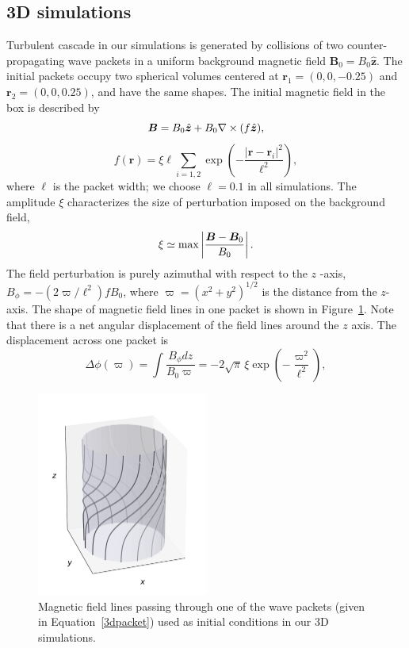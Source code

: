\subsection{3D simulations}\label{sec:3d}
%
Turbulent cascade in our simulations is generated by collisions of two counter-propagating \alfven wave packets in a uniform background magnetic field $\boldsymbol{B}_0=B_0\hat{\boldsymbol{z}}$. 
The initial packets occupy two spherical volumes centered at $\boldsymbol{r}_1 = (0,0,-0.25)$ and $\boldsymbol{r}_2 = (0,0,0.25)$, and have the same shapes. The initial magnetic field in the box is described by
%
\begin{equation}
  \boldsymbol{B} = B_0\hat{\boldsymbol{z}}+ B_0\nabla \times(f\hat{\boldsymbol{z}}),
\end{equation}
\begin{equation}\label{3dpacket}
	f(\boldsymbol{r}) = \xi\ell\sum\limits_{i=1,2} \exp\left(- \frac{|\boldsymbol{r}-\boldsymbol{r}_i|^2}{\ell^2} \right),  
\end{equation}
%
where  $\ell$ is the packet width; we choose $\ell=0.1$ in all simulations.
The amplitude $\xi$ characterizes the size of perturbation imposed on the background field,
%
\begin{eqnarray}
\xi \simeq \max \left|\frac{\boldsymbol{B} -   \boldsymbol{B}_0}{B_0}\right|.
\end{eqnarray}
%
The field perturbation is purely azimuthal with respect to the $z$ -axis, $B_\phi=-(2\varpi/\ell^2)f B_0$, where $\varpi=(x^2+y^2)^{1/2}$ is the distance from the $z$-axis.
The shape of magnetic field lines in one packet is shown in Figure~\ref{field_line}. Note that there is a net angular displacement of the field lines around the $z$ axis.
The displacement across one packet is 
%
\begin{equation}
\Delta\phi(\varpi)=\int \frac{B_\phi dz}{B_0\varpi}=-2\sqrt{\pi}\,\xi\exp\left(-\frac{\varpi^2}{\ell^2}\right),
\end{equation}
%
\begin{figure}[h]
\centering
\includegraphics[width=0.5\textwidth]{pics/chap4/field_lines.pdf}
\caption[Magnetic field lines passing through one of the \alfven wave packets]{Magnetic field lines passing through one of the \alfven wave packets (given in Equation~\ref{3dpacket}) used as initial conditions in our 3D simulations.}
\label{field_line}
\end{figure}

